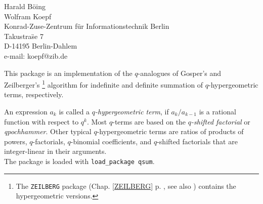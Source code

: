 {\setcounter{redprompt}{0}}
\newcommand{\redprompt}{\stepcounter{redprompt}\theredprompt:}
\newenvironment{redoutput}{\small\begin{alltt}}{\end{alltt}\noindent{}}

{\footnotesize
\begin{center}
Harald B\"oing \\
Wolfram Koepf \\
Konrad-Zuse-Zentrum f\"ur Informationstechnik Berlin \\
Takustra\"se 7 \\
D-14195 Berlin-Dahlem \\
e-mail: koepf@zib.de
\end{center}
}


This package is an implementation of the $q$-analogues of Gosper's
and Zeilberger's
%
\footnote{The {\tt ZEILBERG} package (Chap. \ref{ZEILBERG} 
p. \pageref{ZEILBERG}, see also \cite{Koepf:95})
contains the hypergeometric versions.}
%
algorithm for indefinite and definite summation of
$q$-hypergeometric terms, respectively.

An expression $a_k$ is called a {\sl $q$-hypergeometric term}, if
$a_{k}/a_{k-1}$ is a rational function with respect to $q^k$. Most
$q$-terms are based on the {\sl $q$-shifted factorial} or 
{\sl qpochhammer}. Other typical $q$-hypergeometric terms are ratios 
of products of powers, $q$-factorials, $q$-binomial coefficients, and 
$q$-shifted factorials that are integer-linear in their arguments. \\
The package is loaded with {\tt load\_package qsum}.

